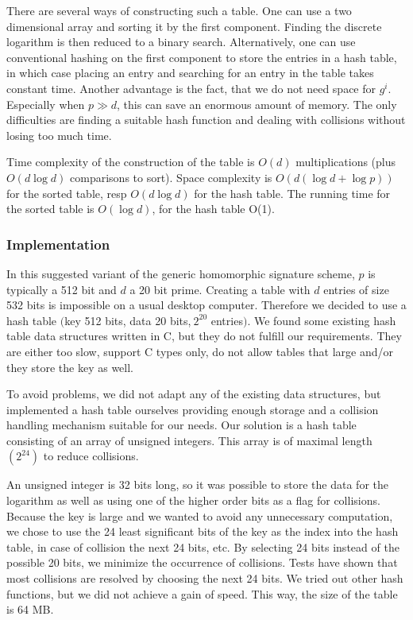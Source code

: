 \documentclass[a4paper, 11pt]{article}
\begin{document}
 There are several ways of constructing such a table. One can use a two dimensional array and sorting it by the first component. Finding the discrete logarithm is then reduced to a binary search. Alternatively, one can use conventional hashing on the first component to store the 
 entries in a hash table, in which case placing an entry and searching for an entry in the table takes constant time. Another advantage is the fact, that we do not need space for $g^i$. Especially when $p \gg d$, this can save an enormous amount of memory. The only difficulties are finding a suitable hash function and dealing with collisions without losing too much time. 
 
 Time complexity of the construction of the table is $O(d)$ multiplications 
 (plus $O(d \log d )$ comparisons to sort). Space complexity is $O(d(\log d + \log p))$ for the sorted table, resp $O(d \log d)$ for the hash table. The running time for the sorted table is $O(\log d)$, for the hash table O(1). 
 
 \subsubsection{Implementation} 
 In this suggested variant of the generic homomorphic signature scheme, $p$ is typically a 512 bit and $d$ a 20 bit prime. Creating a table with $d$ entries of size 532 bits is impossible on a usual desktop computer. 
 Therefore we decided to use a hash table $($key 512 bits, data 20 bits,$~ 2^{20}$ entries$)$. We found some existing hash table data structures written in C, but they do not fulfill our requirements. They are either too slow, support C types only, do not allow tables that large and/or they store the key as well. 
 
 To avoid problems, we did not adapt any of the existing data structures, but implemented a hash table ourselves providing enough storage and a collision handling mechanism suitable for our needs. Our solution is a hash table consisting of an array of unsigned integers. This array is of maximal length $(2^{24})$ to reduce collisions. 
 
 An unsigned integer is 32 bits long, so it was possible to store the data for the logarithm as well as using one of the higher order bits as a flag for collisions.  Because the key is large and we wanted to avoid any unnecessary computation, we chose to use the 24 least significant bits of the key 
 as the index into the hash table, in case of collision the next 24 bits, etc. By selecting 24 bits instead of the possible 20 bits, we minimize the occurrence of collisions. Tests have shown that most collisions are resolved by choosing the next 24 bits. We tried out other hash functions, but 
 we did not achieve a gain of speed. This way, the size of the table is 64 MB. 
 
\end{document}
